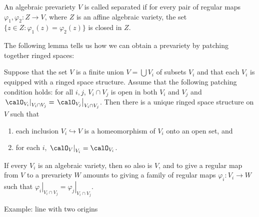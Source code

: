 \begin{definition}
An algebraic prevariety $V$ is called separated if for every pair of regular maps $\varphi_1, \varphi_2 : Z \to V$, where $Z$ is an affine algebraic variety, the set $\{z \in Z : \varphi_1(z) = \varphi_2(z)\}$ is closed in $Z$.
\end{definition}

The following lemma tells us how we can obtain a prevariety by patching together ringed spaces:

\begin{proposition}
Suppose that the set $V$ is a finite union $V = \bigcup V_i$  of subsets $V_i$ and that each $V_i$ is equipped with a ringed space structure.
Assume that the following patching condition holds: for all $i,j$, $V_i \cap V_j$ is open in both $V_i$ and $V_j$ and $\left. \calO_{V_i} \right|_{V_i \cap V_j} = \left. \calO_{V_j} \right|_{V_i \cap V_j}$.
Then there is a unique ringed space structure on $V$ such that
\begin{enumerate}
\item
each inclusion $V_i \hookrightarrow V$ is a homeomorphism of $V_i$ onto an open set, and

\item
for each $i$, $\left. \calO_V \right|_{V_i} = \calO_{V_i}$.
\end{enumerate}
If every $V_i$ is an algebraic variety, then so also is $V$, and to give a regular map from $V$ to a prevariety $W$ amounts to giving a family of regular maps $\varphi_i : V_i \to W$ such that $\left. \varphi_i \right|_{V_i \cap V_j} = \left. \varphi_j \right|_{V_i \cap V_j}$.
\end{proposition}

Example: line with two origins


